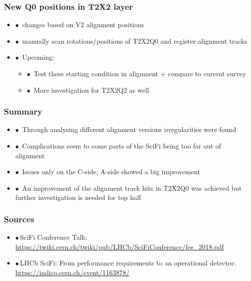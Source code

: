 \documentclass[aspectratio=1610, 12pt]{beamer}
\begin{document}
\begin{frame}\frametitle{New Q0 positions in T2X2 layer}
  \begin{itemize}
    \item $\bullet$\, changes based on V2 alignment positions
    \item $\bullet$\, manually scan rotations/positions of T2X2Q0 and register alignment tracks
    \item $\bullet$\, Upcoming:
    \begin{itemize}
      \item $\bullet$\, Test these starting condition in alignment + compare to current survey
      \item $\bullet$\, More investigation for T2X2Q2 as well
    \end{itemize}
  \end{itemize}
  \begin{figure}
  \end{figure}
\end{frame}

\begin{frame}\frametitle{Summary}
  \begin{itemize}
    \item $\bullet$\, Through analysing different alignment versions irregularities were found
    \item $\bullet$\, Complications seem to come parts of the SciFi being too far out of alignment
    \item $\bullet$\, Issues only on the C-side; A-side showed a big improvement
    \item $\bullet$\, An improvement of the alignment track hits in T2X2Q0 was achieved but further investigation is needed for top half
  \end{itemize}
\end{frame}

\begin{frame}\frametitle{Sources}
  \begin{itemize}
    \item $\bullet$\,SciFi Conference Talk: \url{https://twiki.cern.ch/twiki/pub/LHCb/SciFiConference/fee_2018.pdf}
    \item $\bullet$\,LHCb SciFi: From performance requirements to an operational detector: \url{https://indico.cern.ch/event/1163878/}
  \end{itemize}
\end{frame}
\end{document}
